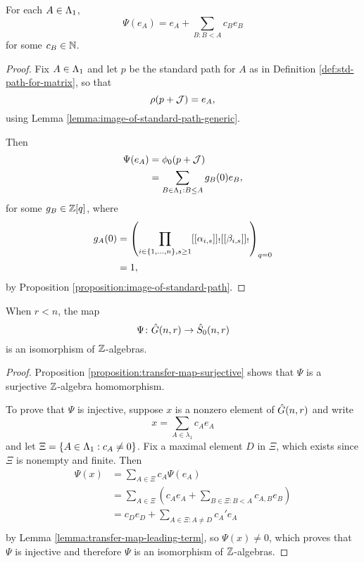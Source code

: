 \documentclass[a4paper, 11pt]{report}
\begin{document}
\begin{lemma}\label{lemma:transfer-map-leading-term}
For each $A\in\Lambda_1{}$,
\begin{equation*}
\Psi(e_A) = e_A +\sum_{B:B<A} c_B e_B
\end{equation*}
for some $c_B\in\mathbb{N}$.
\end{lemma}

\begin{proof}
Fix $A\in\Lambda_1{}$ and let $p$ be the standard path for $A$ as in Definition \ref{def:std-path-for-matrix}, so that
\begin{equation*}
\rho(p+\mathcal{J})=e_A,
\end{equation*}
using Lemma \ref{lemma:image-of-standard-path-generic}.

Then
\begin{align*}
\Psi(e_A)
&= \phi_0(p+\mathcal{J})\\
&= \sum_{B\in\Lambda_1{}:B\le A} g_B(0) e_B,
\end{align*}
for some $g_B\in\mathbb{Z}[q]$, where
\begin{align*}
g_A(0)
&= \left(\prod_{i\in\{1,\ldots,n\},s\geq 1} [[\alpha_{i,s}]]_![[\beta_{i,s}]]_!\right)_{q=0}\\
&= 1,
\end{align*}
by Proposition \ref{proposition:image-of-standard-path}.
\end{proof}

\begin{theorem}
When $r<n$, the map
\begin{equation*}
\Psi\colon\hat{G}(n,r)\to\hat{S}_0(n,r)
\end{equation*}
is an isomorphism of $\mathbb{Z}$-algebras.
\end{theorem}

\begin{proof}
Proposition \ref{proposition:transfer-map-surjective} shows that $\Psi$ is a surjective $\mathbb{Z}$-algebra homomorphism.

To prove that $\Psi$ is injective, suppose $x$ is a nonzero element of $\hat{G}(n,r)$ and write
\begin{equation*}
x = \sum_{A\in\lambda_1} c_Ae_A
\end{equation*}
and let $\Xi=\{A\in\Lambda_1{}:c_A\neq 0\}$. Fix a maximal element $D$ in $\Xi$, which exists since $\Xi$ is nonempty and finite. Then
\begin{align*}
\Psi(x)
&= \sum_{A\in\Xi} c_A\Psi(e_A)\\
&= \sum_{A\in\Xi} \left(c_Ae_A + \sum_{B\in\Xi:B<A} c_{A,B}e_B\right)\\
&= c_De_D + \sum_{A\in\Xi:A\neq D} c_A' e_A\\
\end{align*}
by Lemma \ref{lemma:transfer-map-leading-term}, so $\Psi(x)\neq 0$, which proves that $\Psi$ is injective and therefore $\Psi$ is an isomorphism of $\mathbb{Z}$-algebras. 
\end{proof}
\end{document}
